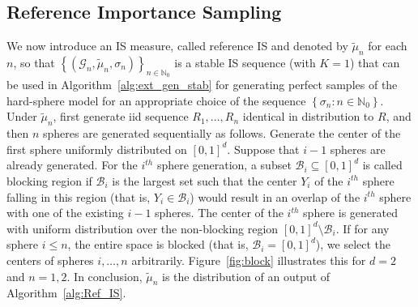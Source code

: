 \documentclass[11pt]{article}
\newcommand{\mbb}{\mathbb}
\newcommand{\lt}{\left}
\newcommand{\rt}{\right}
\newcommand{\wt}{\widetilde}
\begin{document}
\subsection{Reference Importance Sampling}
\label{sec:RIS}
We now introduce an IS measure, called reference IS and denoted by $\wt \mu_n$ for each $n$, so that  $\lt\{ \lt(\mathscr{G}_n, \wt \mu_n, \sigma_n\rt)\rt\}_{n \in \mbb{N}_0}$ is a stable IS sequence (with $K = 1$) that can be used in Algorithm~\ref{alg:ext_gen_stab} for generating perfect samples of the hard-sphere model for an appropriate choice of the sequence $\lt\{\sigma_n : n \in \mbb{N}_0\rt\}$. Under $\wt \mu_n$, first generate iid sequence $R_1, \dots, R_n$ identical in distribution to $R$, and then $n$ spheres are generated sequentially as follows. Generate the center of the first sphere uniformly distributed on $[0,1]^d$. Suppose that $i-1$ spheres are already generated. For the $i^{th}$ sphere generation, a subset $\mathcal{B}_i \subseteq [0,1]^d$ is called blocking region if $\mathcal{B}_i$ is the largest set such that the center $Y_i$ of the $i^{th}$ sphere falling in this region (that is, $Y_i \in \mathcal{B}_i $) would result in an overlap of the $i^{th}$ sphere with  one of the existing $i-1$ spheres.  
The center of the $i^{th} $ sphere is generated with uniform distribution over the non-blocking region $[0,1]^d\setminus \mathcal{B}_i$. If for any sphere $i \leq n$, the entire space is blocked (that is, $\mathcal{B}_i = [0,1]^d$), we select the centers of spheres $ i, \dots, n$ arbitrarily. Figure~\ref{fig:block} illustrates this for $d =2$ and $n = 1,2$. In conclusion, $\wt \mu_n$ is the distribution of an output of Algorithm~\ref{alg:Ref_IS}.
\end{document}
